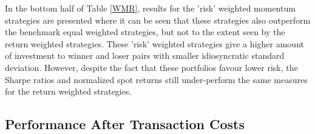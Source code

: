 \documentclass{article}
\begin{document}
In the bottom half of Table \ref{WMR}, results for the 'risk' weighted momentum strategies are presented where it can be seen that these strategies also outperform the benchmark equal weighted strategies, but not to the extent seen by the return weighted strategies. These 'risk' weighted strategies give a higher amount of investment to winner and loser pairs with smaller idiosyncratic standard deviation. However, despite the fact that these portfolios favour lower risk, the Sharpe ratios and normalized spot returns still under-perform the same measures for the return weighted strategies.\\

\subsection{Performance After Transaction Costs}
\end{document}
